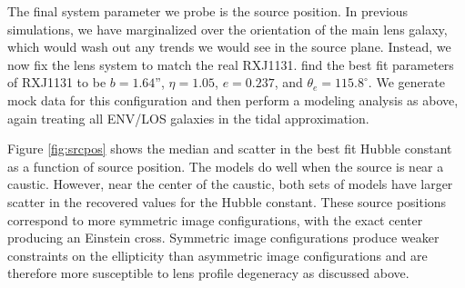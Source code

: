 \documentclass{emulateapj}
\begin{document}
The final system parameter we probe is the source position. In previous simulations, we have marginalized over the orientation of the main lens galaxy, which would wash out any trends we would see in the source plane. Instead, we now fix the lens system to match the real RXJ1131. \citet{Suyu13} find the best fit parameters of RXJ1131 to be $b = 1.64$'', $\eta = 1.05$, $e = 0.237$, and $\theta_e = 115.8^{\circ}$. We generate mock data for this configuration and then perform a modeling analysis as above, again treating all ENV/LOS galaxies in the tidal approximation.

Figure \ref{fig:srcpos} shows the median and scatter in the best fit Hubble constant as a function of source position. The models do well when the source is near a caustic. However, near the center of the caustic, both sets of models have larger scatter in the recovered values for the Hubble constant. These source positions correspond to more symmetric image configurations, with the exact center producing an Einstein cross. Symmetric image configurations produce weaker constraints on the ellipticity than asymmetric image configurations and are therefore more susceptible to lens profile degeneracy as discussed above.
\end{document}
